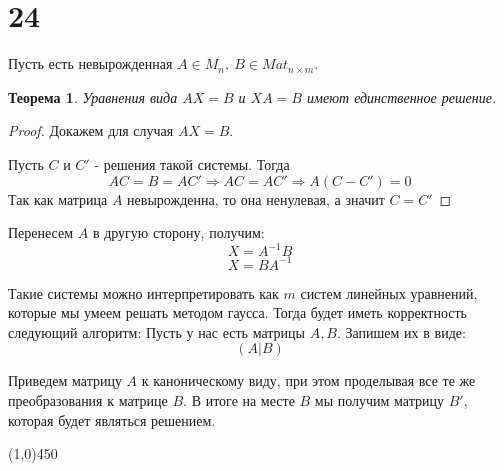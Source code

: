 \documentclass[a4paper,12pt]{article}
\newtheorem*{ther}{Теорема}
\begin{document}
	\section*{24}
	Пусть есть невырожденная $A \in M_n, \ B \in Mat_{n \times m}$.
	\begin{ther}
		Уравнения вида $AX = B$ и $XA = B$ имеют единственное решение. 
	\end{ther}
	\begin{proof}
		Докажем для случая $AX = B$.
		
		Пусть $C$ и $C'$ - решения такой системы. Тогда
		\[
		AC = B = AC' \Rightarrow AC = AC' \Rightarrow A(C - C') = 0
		\]
		Так как матрица $A$ невырожденна, то она ненулевая, а значит $C = C'$
	\end{proof}
	Перенесем  $A$ в другую сторону, получим:
	\[
	X = A^{-1}B\]
	\[X = BA^{-1}
	\]
	
	Такие системы можно интерпретировать как $m$ систем линейных уравнений, которые мы умеем решать методом гаусса. Тогда будет иметь корректность следующий алгоритм:
		Пусть у нас есть матрицы $A, B$. Запишем их в виде:
		\[
		(A|B)
		\]
		
		Приведем матрицу $A$ к каноническому виду, при этом проделывая все те же преобразования к матрице $B$. В итоге на месте $B$ мы получим матрицу $B'$, которая будет являться решением.
	
	\begin{center}
		\line(1,0){450}
	\end{center}
\end{document}
